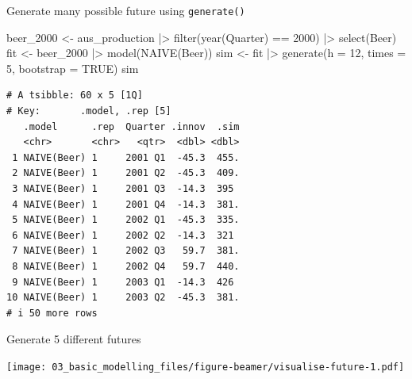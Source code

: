 \documentclass[
  14pt,
  ignorenonframetext,
  aspectratio=169,
]{beamer}
\newenvironment{Shaded}{\begin{snugshade}}{\end{snugshade}}
\newcommand{\AttributeTok}[1]{\textcolor[rgb]{0.77,0.63,0.00}{#1}}
\newcommand{\ConstantTok}[1]{\textcolor[rgb]{0.00,0.00,0.00}{#1}}
\newcommand{\DecValTok}[1]{\textcolor[rgb]{0.00,0.00,0.81}{#1}}
\newcommand{\FunctionTok}[1]{\textcolor[rgb]{0.00,0.00,0.00}{#1}}
\newcommand{\NormalTok}[1]{\textcolor[rgb]{0.00,0.00,0.00}{#1}}
\newcommand{\OtherTok}[1]{\textcolor[rgb]{0.56,0.35,0.01}{#1}}
\newcommand{\SpecialCharTok}[1]{\textcolor[rgb]{0.00,0.00,0.00}{#1}}
\renewenvironment{Shaded}{\vspace*{0.15cm}\color{black}\fontsize{10}{10}\sf\begin{snugshade}\color{black}}{\end{snugshade}}
\begin{document}
\begin{frame}[fragile]{Generate many possible future using
\texttt{generate()}}
\protect\hypertarget{generate-many-possible-future-using-generate}{}
\fontsize{10}{13}\sf

\begin{Shaded}
\begin{Highlighting}[]
\NormalTok{beer\_2000 }\OtherTok{\textless{}{-}}\NormalTok{ aus\_production }\SpecialCharTok{|\textgreater{}} \FunctionTok{filter}\NormalTok{(}\FunctionTok{year}\NormalTok{(Quarter) }\SpecialCharTok{==} \DecValTok{2000}\NormalTok{) }\SpecialCharTok{|\textgreater{}} \FunctionTok{select}\NormalTok{(Beer)}
\NormalTok{fit }\OtherTok{\textless{}{-}}\NormalTok{ beer\_2000 }\SpecialCharTok{|\textgreater{}}
  \FunctionTok{model}\NormalTok{(}\FunctionTok{NAIVE}\NormalTok{(Beer))}
\NormalTok{sim }\OtherTok{\textless{}{-}}\NormalTok{ fit }\SpecialCharTok{|\textgreater{}} \FunctionTok{generate}\NormalTok{(}\AttributeTok{h =} \DecValTok{12}\NormalTok{, }\AttributeTok{times =} \DecValTok{5}\NormalTok{, }\AttributeTok{bootstrap =} \ConstantTok{TRUE}\NormalTok{)}
\NormalTok{sim}
\end{Highlighting}
\end{Shaded}

\begin{verbatim}
# A tsibble: 60 x 5 [1Q]
# Key:       .model, .rep [5]
   .model      .rep  Quarter .innov  .sim
   <chr>       <chr>   <qtr>  <dbl> <dbl>
 1 NAIVE(Beer) 1     2001 Q1  -45.3  455.
 2 NAIVE(Beer) 1     2001 Q2  -45.3  409.
 3 NAIVE(Beer) 1     2001 Q3  -14.3  395 
 4 NAIVE(Beer) 1     2001 Q4  -14.3  381.
 5 NAIVE(Beer) 1     2002 Q1  -45.3  335.
 6 NAIVE(Beer) 1     2002 Q2  -14.3  321 
 7 NAIVE(Beer) 1     2002 Q3   59.7  381.
 8 NAIVE(Beer) 1     2002 Q4   59.7  440.
 9 NAIVE(Beer) 1     2003 Q1  -14.3  426 
10 NAIVE(Beer) 1     2003 Q2  -45.3  381.
# i 50 more rows
\end{verbatim}
\end{frame}

\begin{frame}{Generate 5 different futures}
\protect\hypertarget{generate-5-different-futures}{}
\fontsize{10}{13}\sf

\texttt{[image: 03\_basic\_modelling\_files/figure-beamer/visualise-future-1.pdf]}
\end{frame}
\end{document}
